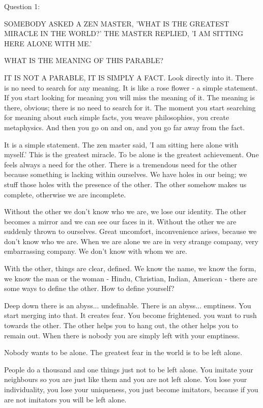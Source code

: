 Question 1:

SOMEBODY ASKED A ZEN MASTER, 'WHAT IS THE GREATEST MIRACLE
IN THE WORLD?' THE MASTER REPLIED, 'I AM SITTING HERE ALONE
WITH ME.'

WHAT IS THE MEANING OF THIS PARABLE?

IT IS NOT A PARABLE, IT IS SIMPLY A FACT. Look directly into it. There is no need to search for any meaning. It is like a rose flower - a simple statement. If you start looking for meaning you will miss the meaning of it. The meaning is there, obvious; there is no need to search for it. The moment you start searching for meaning about such simple facts, you weave philosophies, you create metaphysics. And then you go on and on, and you go far away from the fact.

It is a simple statement. The zen master said, 'I am sitting here alone with myself.' This is the greatest miracle. To be alone is the greatest achievement. One feels always a need for the other. There is a tremendous need for the other because something is lacking within ourselves. We have holes in our being; we stuff those holes with the presence of the other. The other somehow makes us complete, otherwise we are incomplete.

Without the other we don't know who we are, we lose our identity. The other becomes a mirror and we can see our faces in it. Without the other we are suddenly thrown to ourselves. Great uncomfort, inconvenience arises, because we don't know who we are. When we are alone we are in very strange company, very embarrassing company. We don't know with whom we are.

With the other, things are clear, defined. We know the name, we know the form, we know the man or the woman - Hindu, Christian, Indian, American - there are some ways to define the other. How to define yourself?

Deep down there is an abyss... undefinable. There is an abyss... emptiness. You start merging into that. It creates fear. You become frightened. you want to rush towards the other. The other helps you to hang out, the other helps you to remain out. When there is nobody you are simply left with your emptiness.

Nobody wants to be alone. The greatest fear in the world is to be left alone.

People do a thousand and one things just not to be left alone. You imitate your neighbours so you are just like them and you are not left alone. You lose your individuality, you lose your uniqueness, you just become imitators, because if you are not imitators you will be left alone.


